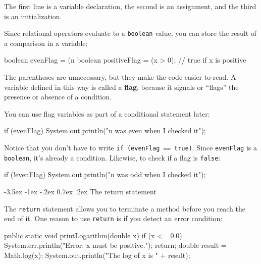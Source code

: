 \documentclass[12pt]{book}
\makeatletter
\theoremstyle{exercise}
\newcommand{\java}[1]{\verb"#1"}
\renewcommand{\section}{\@startsection{section}{1}{\z@}%
    {-3.5ex \@plus -1ex \@minus -.2ex}%
    {0.7ex \@plus.2ex}%
    {\normalfont\Large\bfseries}}
\newcommand{\java}[1]{\lstinline{#1}} %
\makeatother
\begin{document}

The first line is a variable declaration, the second is an assignment, and the third is an initialization.


Since relational operators evaluate to a \java{boolean} value, you can store the result of a comparison in a variable:

\begin{code}
    boolean evenFlag = (n %
    boolean positiveFlag = (x > 0);     // true if x is positive
\end{code}

The parentheses are unnecessary, but they make the code easier to read.
A variable defined in this way is called a {\bf flag}, because it signals or ``flags'' the presence or absence of a condition.

You can use flag variables as part of a conditional statement later:

\begin{code}
    if (evenFlag) {
        System.out.println("n was even when I checked it");
    }
\end{code}

Notice that you don't have to write \java{if (evenFlag == true)}.
Since \java{evenFlag} is a \java{boolean}, it's already a condition.
Likewise, to check if a flag is \java{false}:

\begin{code}
    if (!evenFlag) {
        System.out.println("n was odd when I checked it");
    }
\end{code}


\section{The return statement}


The \java{return} statement allows you to terminate a method before you reach the end of it.
One reason to use \java{return} is if you detect an error condition:

\begin{code}
    public static void printLogarithm(double x) {
        if (x <= 0.0) {
            System.err.println("Error: x must be positive.");
            return;
        }
        double result = Math.log(x);
        System.out.println("The log of x is " + result);
    }
\end{code}
\end{document}
